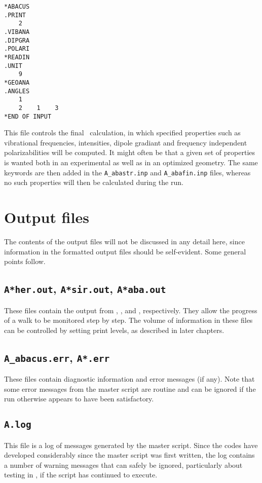 \begin{verbatim}
*ABACUS
.PRINT
    2
.VIBANA
.DIPGRA
.POLARI
*READIN
.UNIT
    9
*GEOANA
.ANGLES
    1
    2    1    3
*END OF INPUT
\end{verbatim}

This file controls the final \aba\ calculation, in which specified
properties such as vibrational frequencies, intensities, dipole
gradiant and frequency independent polarizabilities will be computed.
It might often be that a given set of properties is wanted both in an
experimental as well as in an optimized geometry. The same keywords
are then added in the {\tt A\_abastr.inp} and {\tt A\_abafin.inp}
files, whereas no such properties will then be calculated during the
run.

\section{Output files}

The contents of the output files will not be discussed in any
detail here, since information in the formatted output files
should be self-evident.  Some general points follow.

\subsection{{\tt A*her.out}, {\tt A*sir.out}, {\tt A*aba.out}}

These files contain the output from \her, \sir, and \aba,
respectively.  They allow the progress of a walk to be monitored
step by step.  The volume of information in these files can be
controlled by setting print levels, as described in later
chapters.

\subsection{{\tt A\_abacus.err}, {\tt A*.err}}

These files contain diagnostic information and error messages (if
any).  Note that some error messages from the master script are
routine and can be ignored if the run otherwise appears to have
been satisfactory.

\subsection{{\tt A.log}}

This file is a log of messages generated by the master script.
Since the codes have developed considerably since the master
script was first written, the log contains a number of warning
messages that can safely be ignored, particularly about testing in
\sir, if the script has continued to execute.


